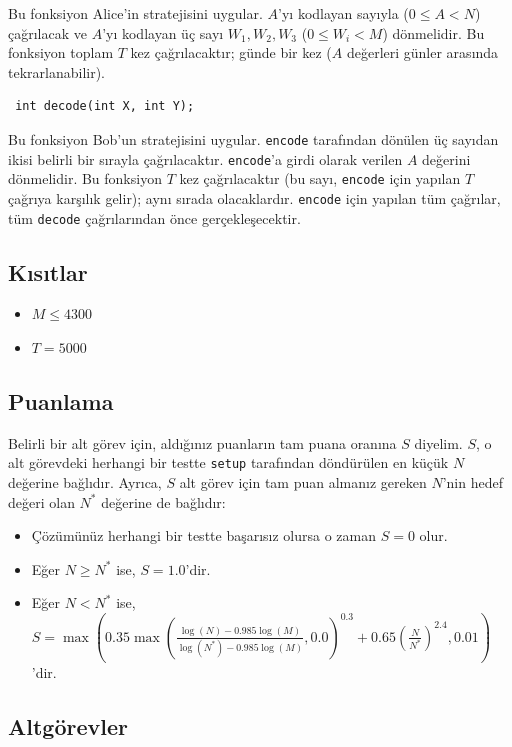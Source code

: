 \documentclass[12pt]{article}
\begin{document}
Bu fonksiyon Alice'in stratejisini uygular. $A$'yı kodlayan sayıyla ($0 \leq A < N$) çağrılacak ve $A$'yı kodlayan üç sayı $W_1, W_2, W_3$ ($0 \leq W_i < M$) dönmelidir. Bu fonksiyon toplam $T$ kez çağrılacaktır; günde bir kez ($A$ değerleri günler arasında tekrarlanabilir).

\begin{lstlisting}
 int decode(int X, int Y);
\end{lstlisting}

Bu fonksiyon Bob'un stratejisini uygular. \texttt{encode} tarafından dönülen üç sayıdan ikisi belirli bir sırayla çağrılacaktır. \texttt{encode}'a girdi olarak verilen $A$ değerini dönmelidir. Bu fonksiyon $T$ kez çağrılacaktır (bu sayı, \texttt{encode} için yapılan $T$ çağrıya karşılık gelir); aynı sırada olacaklardır. \texttt{encode} için yapılan tüm çağrılar, tüm \texttt{decode} çağrılarından önce gerçekleşecektir.


\subsection{Kısıtlar}

\begin{itemize}
\item $M \leq 4300$
\item $T = 5000$
\end{itemize}

\subsection{Puanlama}

Belirli bir alt görev için, aldığınız puanların tam puana oranına $S$ diyelim. $S$, o alt görevdeki herhangi bir testte \texttt{setup} tarafından döndürülen en küçük $N$ değerine bağlıdır. Ayrıca, $S$ alt görev için tam puan almanız gereken $N$'nin hedef değeri olan $N^*$ değerine de bağlıdır:

\begin{itemize}
\item Çözümünüz herhangi bir testte başarısız olursa o zaman $S = 0$ olur.
\item Eğer $N \geq N^*$ ise, $S = 1.0$'dir.
\item Eğer $N < N^*$ ise, $S = \max\left(0.35 \max\left(\frac{\log(N) - 0.985 \log(M)}{\log(N^*) - 0.985 \log(M)}, 0.0\right)^{0.3} + 0.65 \left(\frac{N}{N^*}\right)^{2.4}, 0.01\right)$'dir.
\end{itemize}

\subsection{Altgörevler}
\end{document}
